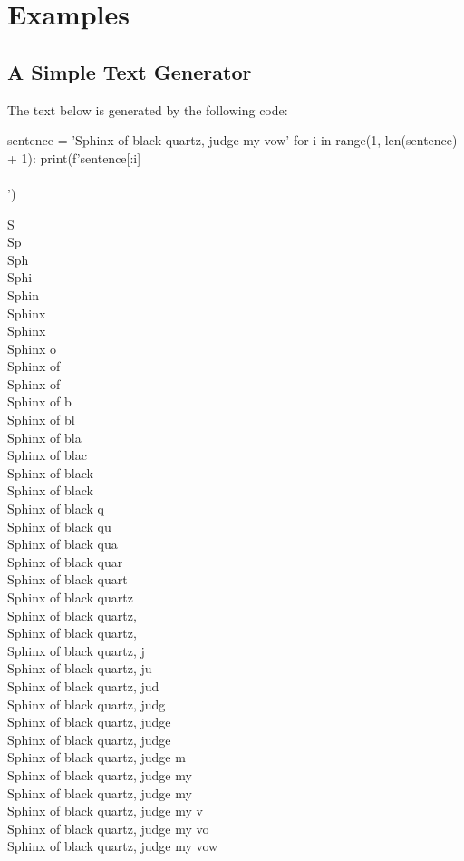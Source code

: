 \documentclass[a4paper]{book}
\begin{document}
\chapter{Examples}
\label{ch:examples}

\section{A Simple Text Generator}
\label{sec:a-simple-text-generator}
The text below is generated by the following code:
\begin{python}
sentence = 'Sphinx of black quartz, judge my vow'
for i in range(1, len(sentence) + 1):
    print(f'{sentence[:i]}\\\\')

\end{python}
S\\
Sp\\
Sph\\
Sphi\\
Sphin\\
Sphinx\\
Sphinx \\
Sphinx o\\
Sphinx of\\
Sphinx of \\
Sphinx of b\\
Sphinx of bl\\
Sphinx of bla\\
Sphinx of blac\\
Sphinx of black\\
Sphinx of black \\
Sphinx of black q\\
Sphinx of black qu\\
Sphinx of black qua\\
Sphinx of black quar\\
Sphinx of black quart\\
Sphinx of black quartz\\
Sphinx of black quartz,\\
Sphinx of black quartz, \\
Sphinx of black quartz, j\\
Sphinx of black quartz, ju\\
Sphinx of black quartz, jud\\
Sphinx of black quartz, judg\\
Sphinx of black quartz, judge\\
Sphinx of black quartz, judge \\
Sphinx of black quartz, judge m\\
Sphinx of black quartz, judge my\\
Sphinx of black quartz, judge my \\
Sphinx of black quartz, judge my v\\
Sphinx of black quartz, judge my vo\\
Sphinx of black quartz, judge my vow\\
\end{document}
